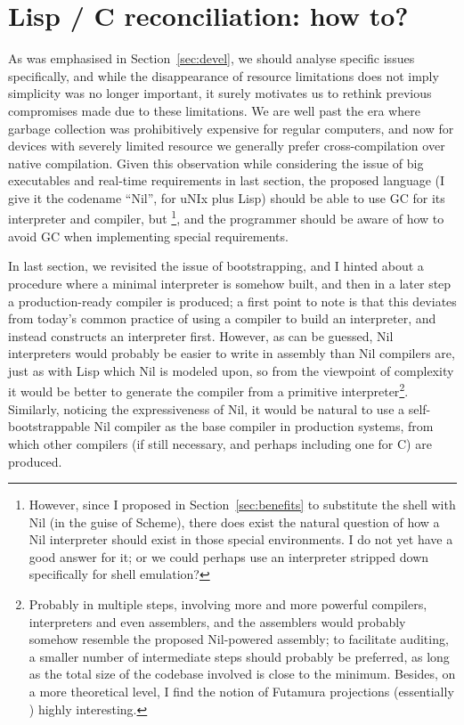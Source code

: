 \section{Lisp / C reconciliation: how to?}\label{sec:howto}

As was emphasised in Section~\ref{sec:devel}, we should analyse specific issues
specifically, and while the disappearance of resource limitations does not imply
simplicity was no longer important, it surely motivates us to rethink previous
compromises made due to these limitations.  We are well past the era where
garbage collection was prohibitively expensive for regular computers, and now
for devices with severely limited resource we generally prefer cross-compilation
over native compilation.  Given this observation while considering the issue
of big executables and real-time requirements in last section, the proposed
language (I give it the codename ``Nil'', for uNIx plus Lisp) should be able
to use GC for its interpreter and compiler, but \footnote{However,
since I proposed in Section~\ref{sec:benefits} to substitute the shell with
Nil (in the guise of Scheme), there does exist the natural question of how
a Nil interpreter should exist in those special environments.  I do not yet
have a good answer for it; or we could perhaps use an interpreter stripped
down specifically for shell emulation?}, and the programmer should be
aware of how to avoid GC when implementing special requirements.

In last section, we revisited the issue of bootstrapping, and I hinted about
a procedure where a minimal interpreter is somehow built, and then in a later
step a production-ready compiler is produced; a first point to note is that
this deviates from today's common practice of using a compiler to build an
interpreter, and instead constructs an interpreter first.  However, as can be
guessed, Nil interpreters would probably be easier to write in assembly than
Nil compilers are, just as with Lisp which Nil is modeled upon, so from the
viewpoint of complexity it would be better to generate the compiler from a
primitive interpreter\footnote{Probably in multiple steps, involving more and
more powerful compilers, interpreters and even assemblers, and the assemblers
would probably somehow resemble the proposed Nil-powered assembly; to facilitate
auditing, a smaller number of intermediate steps should probably be preferred,
as long as the total size of the codebase involved is close to the minimum.
Besides, on a more theoretical level, I find the notion of Futamura projections
(essentially ) highly
interesting.}.  Similarly, noticing the expressiveness of Nil, it would
be natural to use a self-bootstrappable Nil compiler as the base
compiler in production systems, from which other compilers (if
still necessary, and perhaps including one for C) are produced.

